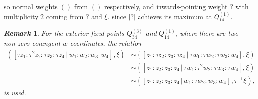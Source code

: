 \documentclass{article}
\newtheorem{remark}{\it Remark\/}
\begin{document}
\begin{itemize}
		so normal weights $()$ from $()$ respectively, and inwards-pointing weight $?$ with multiplicity $2$ coming from $?$ and $\xi$, since $|?|$ achieves its maximum at $Q_{14}^{(1)}$.
		
	\end{itemize}

	\begin{remark}
		For the exterior fixed-points $Q_{34}^{(3)}$ and $Q_{14}^{(1)}$, where there are two non-zero cotangent $w$ coordinates, the relation
		\begin{align*}
			\left( [\tau z_{1} : \tau^{2} z_{2} : \tau z_{3} : \tau z_{4} \, | \, w_{1} : w_{2} : w_{3} : w_{4}], \xi \right) &\sim	\left( [z_{1} : \tau z_{2} : z_{3} : \tau z_{4} \, | \, \tau w_{1} : \tau w_{2} : \tau w_{3} : w_{4}], \xi \right) \\ &\sim \left( [z_{1} : z_{2} : z_{3} : z_{4} \, | \, \tau w_{1} : \tau^{2} w_{2} : \tau w_{3} : \tau w_{4}], \xi \right) \\ &\sim \left( [z_{1} : z_{2} : z_{3} : z_{4} \, | \, w_{1} : \tau w_{2} : w_{3} : w_{4}], \tau^{-1} \xi \right),
		\end{align*}
		is used.
	\end{remark}
	

	
	
	
	
	
	
	
	
	
	
	
	
	
	
	
	
	
	
	
	
	
	
	  
	
	
\end{document}
